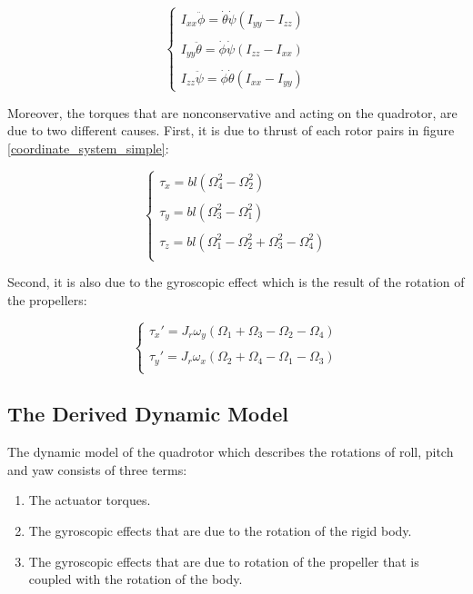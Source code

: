 \documentclass{thesisreport}
\begin{document}
 \begin{equation}
 \begin{cases}
 I_{xx}\ddot{\phi} = \dot{\theta} \dot{\psi}(I_{yy}-I_{zz})\\
 \\
 I_{yy}\ddot{\theta} = \dot{\phi} \dot{\psi}(I_{zz}-I_{xx})\\
 \\
 I_{zz}\ddot{\psi} = \dot{\phi} \dot{\theta} (I_{xx} - I_{yy})
 \end{cases}
 \end{equation}
 
Moreover, the torques that are nonconservative and acting on the quadrotor, are due to two different causes. First, it is due to thrust of each rotor pairs in figure \ref{coordinate_system_simple}:

\begin{equation}
\begin{cases}
\tau_x = bl(\Omega_4^2 - \Omega_2^2)\\
\\
\tau_y = bl(\Omega_3^2 - \Omega_1^2)\\
\\
\tau_z = bl(\Omega_1^2 - \Omega_2^2 + \Omega_3^2 - \Omega_4^2)\\
\end{cases}
\end{equation}

Second, it is also due to the gyroscopic effect which is the result of the rotation of the propellers:

\begin{equation}
\begin{cases}
\tau_x' = J_r \omega_y (\Omega_1 + \Omega_3 - \Omega_2 - \Omega_4)\\
\\
\tau_y' = J_r \omega_x (\Omega_2 + \Omega_4 - \Omega_1 - \Omega_3)\\
\end{cases}
\end{equation}

\subsection{The Derived Dynamic Model}

The dynamic model of the quadrotor which describes the rotations of roll, pitch and yaw consists of three terms:
\begin{enumerate}
	\item The actuator torques.
	\item The gyroscopic effects that are due to the rotation of the rigid body.
	\item The gyroscopic effects that are due to rotation of the propeller that is coupled with the rotation of the body.
\end{enumerate}
\end{document}
